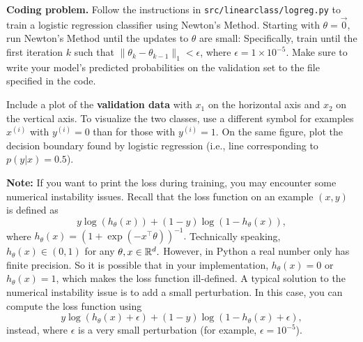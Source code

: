 \item {} \textbf{Coding problem.}
Follow the instructions in \texttt{src/linearclass/logreg.py} to train a
logistic regression classifier using Newton's Method.
Starting with $\theta = \vec{0}$, run Newton's Method until the updates to
$\theta$ are small: Specifically,  train until the first iteration $k$ such
that $\|\theta_{k} - \theta_{k-1}\|_1 < \epsilon$, where
$\epsilon = 1\times 10^{-5}$. Make sure to write your model's predicted probabilities on
the validation set to the file specified in the code.

Include a plot of the \textbf{validation data} with $x_1$ on the horizontal axis and $x_2$ on the vertical axis.
To visualize the two classes, use a different symbol for examples $x^{(i)}$
with $y^{(i)} = 0$ than for those with $y^{(i)} = 1$. On the same figure, plot the decision boundary
found by logistic regression (i.e., line corresponding to $p(y|x) = 0.5$).

\textbf{Note:} If you want to print the loss during training, you may encounter some numerical instability issues. Recall that the loss function on an example $(x,y)$ is defined as
$$y\log(h_{\theta}(x)) +  (1 - y)\log(1 - h_{\theta}(x)),$$
where $h_\theta(x)=(1+\exp(-x^\top \theta))^{-1}.$ Technically speaking, $h_{\theta}(x)\in(0,1)$ for any $\theta,x\in\mathbb{R}^{d}.$ However, in Python a real number only has finite precision. So it is possible that in your implementation, $h_{\theta}(x)=0$ or $h_{\theta}(x)=1$, which makes the loss function ill-defined. A typical solution to the numerical instability issue is to add a small perturbation. In this case, you can compute the loss function using 
$$y\log(h_{\theta}(x) + \epsilon) +  (1 - y)\log(1 - h_{\theta}(x) + \epsilon),$$
instead, where $\epsilon$ is a very small perturbation (for example, $\epsilon=10^{-5}$).
